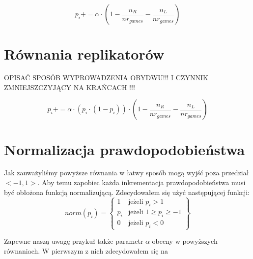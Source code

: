 \begin{equation} \label{eq:stand}
p_i += \alpha \cdot (1 - \frac{n_R}{nr_{games}} - \frac{n_L}{nr_{games}})
\end{equation}

\section{Równania replikatorów}
\label{sec:r_repli}

OPISAĆ SPOSÓB WYPROWADZENIA OBYDWU!!! I CZYNNIK ZMNIEJSZCZYJĄCY NA KRAŃCACH !!!

\begin{equation} \label{eq:repli}
p_i += \alpha \cdot (p_i \cdot (1 - p_i)) \cdot (1 - \frac{n_R}{nr_{games}} - \frac{n_L}{nr_{games}})
\end{equation}

\section{Normalizacja prawdopodobieństwa}
\label{sec:normalizacja}
Jak zauważyliśmy powyższe równania w łatwy sposób mogą wyjść poza przedział $<-1,1>$. Aby temu zapobiec każda inkrementacja prawdopodobieństwa musi być obłożona funkcją normalizującą. Zdecydowałem się użyć następującej funkcji:
\begin{displaymath}
norm(p_i) = \left\{
\begin{array}{ll}
1 & \text{jeżeli } p_i > 1 \\
p_i & \text{jeżeli } 1 \geq p_i \geq -1 \\
0 & \text{jeżeli } p_i < 0
\end{array} 
\right\}
\end{displaymath}

Zapewne naszą uwagę przykuł także parametr $\alpha$ obecny w powyższych równaniach. W pierwszym z nich zdecydowałem się na 